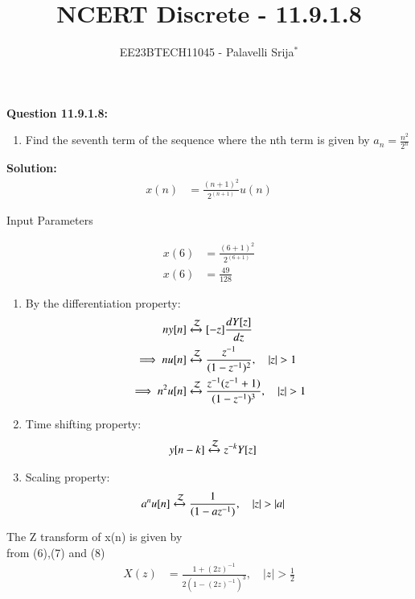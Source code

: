 \documentclass[journal,12pt,twocolumn]{IEEEtran}
\theoremstyle{remark}
\begin{document}

\vspace{3cm}

\title{NCERT Discrete - 11.9.1.8}
\author{EE23BTECH11045 - Palavelli Srija$^{*}$%
}
\maketitle
\newpage
\bigskip

\renewcommand{\thefigure}{\theenumi}
\renewcommand{\thetable}{\theenumi}

\vspace{3cm}
\textbf{Question 11.9.1.8:} 
\begin{enumerate}
\item Find the seventh term of the sequence where the nth term is given by $a_n= \frac {n^2}{2^{n}}$

\end{enumerate}
\textbf{Solution: }
\begin{align}
 x(n) &= \frac{(n+1)^2}{2^{(n+1)}}u(n)
\end{align}
\begin{table}[h!]
    \centering
    
    \caption{Input Parameters}
    \label{tab:table_9.8.1}
   \end{table}
\begin{align}
x(6) &= \frac{(6+1)^2}{2^{(6+1)}}\\
x(6) &= \frac {49}{128}
\end{align}
\begin{enumerate}
    \item 
    By the differentiation property:
    \begin{align}
     n y[n] & \xleftrightarrow{\mathcal{Z}} [-z] \frac{dY[z]}{dz} \\
     \implies n u[n] & \xleftrightarrow{\mathcal{Z}}  \frac{z^{-1}}{(1-z^{-1})^2}, \quad \lvert z \rvert > 1 \\
     \implies n^2 u[n] & \xleftrightarrow{\mathcal{Z}}  \frac{z^{-1}(z^{-1}+1)}{(1-z^{-1})^3}, \quad \lvert z \rvert > 1
   \end{align}
    \item 
    Time shifting property:
    \begin{align}
         y[n-k] & \xleftrightarrow{\mathcal{Z}} z^{-k}Y[z] 
     \end{align}
     \item 
     Scaling property:
     \begin{align}
         a^{n} u[n] & \xleftrightarrow{\mathcal{Z}}  \frac{1}{(1-az^{-1})}, \quad \lvert z \rvert > \lvert a \rvert 
     \end{align}
    \end{enumerate}
	The Z transform of x(n) is given by \\
	from (6),(7) and (8)
    \begin{align}
     X(z) &= \frac{1 + (2z)^{-1}}{2(1 - (2z)^{-1})^3}, \quad \lvert z \rvert > \frac{1}{2}
     \end{align}
\end{document}

